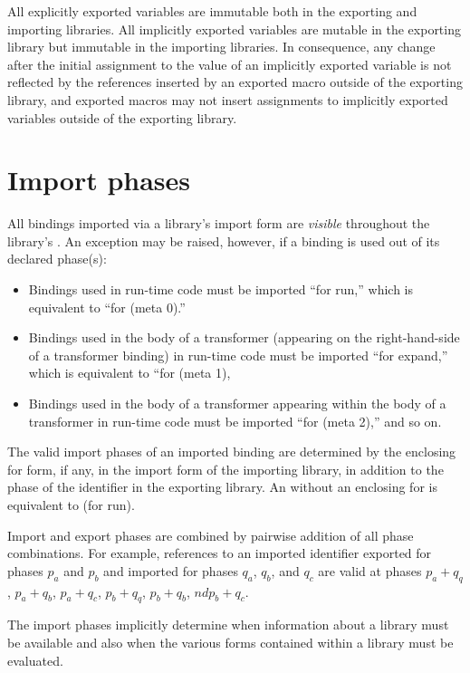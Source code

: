 All explicitly exported variables are immutable both in the exporting and
importing libraries.
All implicitly exported variables are mutable in the exporting library but
immutable in the importing libraries.
In consequence, any change after the initial assignment to the value of an
implicitly exported variable is not reflected by the references inserted
by an exported macro outside of the exporting library, and exported macros
may not insert assignments to implicitly exported variables outside of the
exporting library.

\section{Import phases}
\label{phasessection}

All bindings imported via a library's {\cf import} form are
\emph{visible} throughout the library's .
An exception may be raised, however, if a binding is used out of its declared
phase(s):

\begin{itemize}
\item Bindings used in run-time code must be imported ``for {\cf run},''
which is equivalent to ``for {\cf (meta 0)}.''
\item Bindings used in the body of a transformer (appearing on the
right-hand-side of a transformer binding) in run-time code must be
imported ``for {\cf expand},'' which is equivalent to
``for {\cf (meta 1)},
\item Bindings used in the body of a transformer appearing within the body of a
transformer in run-time code must be imported ``for {\cf (meta 2)},''
and so on.
\end{itemize}

The valid import phases of an imported binding are determined by the enclosing
{\cf for} form, if any, in the {\cf import} form of the importing
library, in addition to the phase of the identifier in the exporting library.
An  without an enclosing {\cf for} is equivalent to
{\cf (for  run)}.

Import and export phases are combined by pairwise addition of all phase
combinations.  For example, references to an imported identifier exported
for phases $p_a$ and $p_b$ and imported for phases $q_a$, $q_b$, and $q_c$
are valid at phases $p_a+q_q$, $p_a+q_b$, $p_a+q_c$, $p_b+q_q$, $p_b+q_b$,
$nd p_b+q_c$.

The import phases implicitly determine when information about a
library must be available and also when the various forms contained within
a library must be evaluated.


